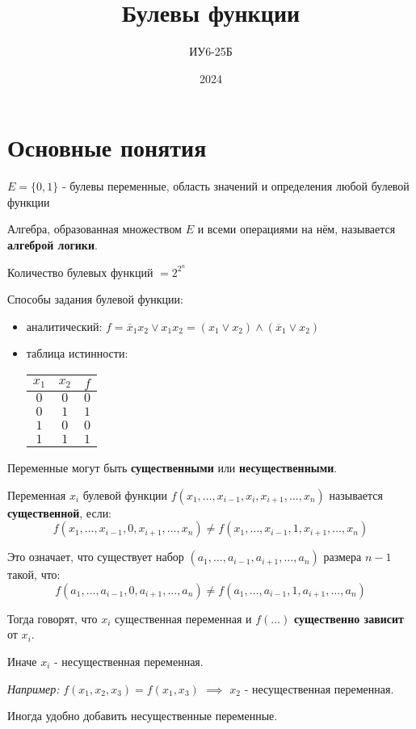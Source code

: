 \documentclass[10pt]{article}
\title{Булевы функции}
\author{ИУ6-25Б}
\date{2024}
\begin{document}
\maketitle


\section*{Основные понятия}
\par $E = \{ 0, 1 \}$ - булевы переменные, область значений и определения любой булевой функции
\par Алгебра, образованная множеством $E$ и всеми операциями на нём, называется \textbf{алгеброй логики}.
\par Количество булевых функций $= 2^{2^n}$
\par Способы задания булевой функции:
\begin{itemize}
    \item аналитический: $f = \overline x_1 x_2 \lor x_1 x_2 = (x_1 \lor x_2) \land (\overline x_1 \lor x_2)$
    \item {
        таблица истинности:
        \par
        \begin{tabular}{|c|c|c|}
            \hline
            $x_1$ & $x_2$ & $f$ \\
            \hline
            $0$ & $0$ & $0$ \\
            $0$ & $1$ & $1$ \\
            $1$ & $0$ & $0$ \\
            $1$ & $1$ & $1$ \\
            \hline
        \end{tabular}
        }
\end{itemize}

\par Переменные могут быть \textbf{существенными} или \textbf{несущественными}.
\par Переменная $x_i$ булевой функции $f(x_1, \dots, x_{i-1}, x_i, x_{i+1}, \dots, x_n)$ называется \textbf{существенной}, если: $$f(x_1, \dots, x_{i-1}, 0, x_{i+1}, \dots, x_n) \ne f(x_1, \dots, x_{i-1}, 1, x_{i+1}, \dots, x_n)$$
\par Это означает, что существует набор $(a_1, \dots, a_{i-1}, a_{i+1}, \dots, a_n)$ размера $n - 1$ такой, что:$$f(a_1, \dots, a_{i-1}, 0, a_{i+1}, \dots, a_n) \ne f(a_1, \dots, a_{i-1}, 1, a_{i+1}, \dots, a_n)$$
\par Тогда говорят, что $x_i$ существенная переменная и $f(\dots)$ \textbf{существенно зависит} от $x_i$.
\par Иначе $x_i$ - несущественная переменная.
\par \textit{Например:} $f(x_1, x_2, x_3) = f(x_1, x_3)$ $\implies$ $x_2$ - несущественная переменная.
\par Иногда удобно добавить несущественные переменные.
\end{document}
